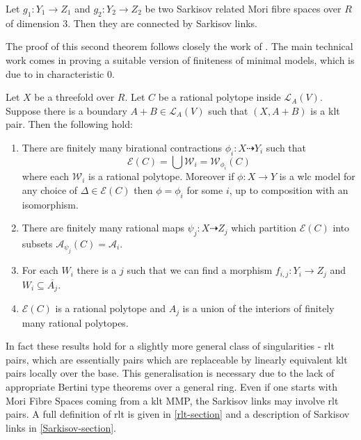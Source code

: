 \documentclass[a4paper,12pt]{amsart}
\begin{document}
	\begin{theorem}
		Let $g_{1}:Y_{1} \to Z_{1}$ and $g_{2}:Y_{2} \to Z_{2}$ be two Sarkisov related Mori fibre spaces over $R$ of dimension $3$. Then they are connected by Sarkisov links.
	\end{theorem}
	
	The proof of this second theorem follows closely the work of \cite{hacon2009sarkisov}. The main technical work comes in proving a suitable version of finiteness of minimal models, which is due to \cite{birkar2010existence} in characteristic $0$. 
	
		\begin{theorem}
		Let $X$ be a threefold over $R$. Let $C$ be a rational polytope inside $\mathcal{L}_{A}(V)$. Suppose there is a boundary $A+B \in \mathcal{L}_{A}(V)$ such that $(X,A+B)$ is a klt pair. Then the following hold:
		
		\begin{enumerate}
			\item There are finitely many birational contractions $\phi_{i}:X \dashrightarrow Y_{i}$ such that 
			\[\mathcal{E}(C) = \bigcup \mathcal{W}_{i}=\mathcal{W}_{\phi_{i}}(C)\]
			where each $\mathcal{W}_{i}$ is a rational polytope. Moreover if $\phi:X \to Y$ is a wlc model for any choice of $\Delta \in \mathcal{E}(C)$ then $\phi=\phi_{i}$ for some $i$, up to composition with an isomorphism.
			
			\item There are finitely many rational maps $\psi_{j}:X \dashrightarrow Z_{j}$ which partition $\mathcal{E}(C)$ into subsets $\mathcal{A}_{\psi_{j}}(C)=\mathcal{A}_{i}$.
			\item  For each $W_{i}$ there is a $j$ such that we can find a morphism $f_{i,j}: Y_{i} \to Z_{j}$ and $W_{i} \subseteq \overline{A_{j}}$.
			\item  $\mathcal{E}(C)$ is a rational polytope and $A_{j}$ is a union of the interiors of finitely many rational polytopes.
		\end{enumerate}
	\end{theorem}
	
	In fact these results hold for a slightly more general class of singularities - rlt pairs, which are essentially pairs which are replaceable by linearly equivalent klt pairs locally over the base. This generalisation is necessary due to the lack of appropriate Bertini type theorems over a general ring. Even if one starts with Mori Fibre Spaces coming from a klt MMP, the Sarkisov links may involve rlt pairs. A full definition of rlt is given in \autoref{rlt-section} and a description of Sarkisov links in \autoref{Sarkisov-section}.
	
\end{document}
